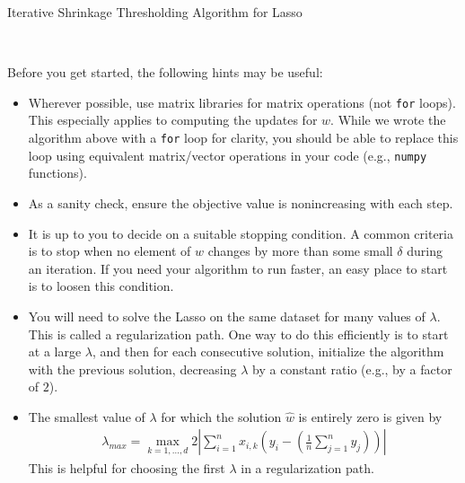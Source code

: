 \documentclass{article}
\begin{document}
\begin{algorithm}[h]
    \caption{Iterative Shrinkage Thresholding Algorithm for Lasso}
    \label{alg:ista}
    \\
\end{algorithm}

Before you get started, the following hints may be useful:
\begin{itemize}
  \item Wherever possible, use matrix libraries for matrix operations (not \texttt{for} loops). This especially applies to computing the updates for $w$. While we wrote the algorithm above with a \texttt{for} loop for clarity, you should be able to replace this loop using equivalent matrix/vector operations in your code (e.g., \texttt{numpy} functions).
  \item As a sanity check, ensure the objective value is nonincreasing with each step. 
  \item It is up to you to decide on a suitable stopping condition.  A common criteria is to stop when no element of
      ${w}$ changes by more than some small $\delta$ during an iteration.  If you need your algorithm to run faster,
      an easy place to start is to loosen this condition.
  \item You will need to solve the Lasso on the same dataset for many values of $\lambda$.  This
      is called a regularization path.  One way to do this efficiently is to start at a large $\lambda$, and then for each consecutive solution, initialize the algorithm with the previous solution, decreasing $\lambda$ by a constant ratio (e.g., by a factor of $2$).
  \item The smallest value of $\lambda$ for which the solution $\widehat{w}$ is entirely zero is given by
       \begin{align}
           \lambda_{max} = \max_{k=1,\dots,d} 2 \left|\sum_{i=1}^n {x}_{i,k} \left({y}_i - \left(\frac{1}{n} \sum_{j=1}^n y_j \right)\right)\right|
           \label{eqn:lasso-lambdamax}
       \end{align}
      This is helpful for choosing the first $\lambda$ in a regularization path. 
\end{itemize}
\end{document}
